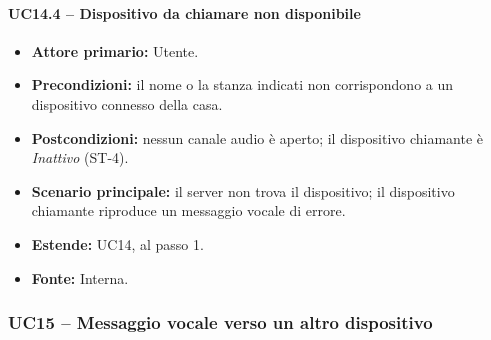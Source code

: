 \documentclass[12pt,a4paper]{article}
\newcommand{\tightlist}{\setlength{\itemsep}{1pt}\setlength{\parskip}{0pt}}
\begin{document}
\paragraph{UC14.4 -- Dispositivo da chiamare non disponibile}

\begin{itemize}

\tightlist

\item \textbf{Attore primario:} Utente.

\item \textbf{Precondizioni:} il nome o la stanza indicati non corrispondono a un dispositivo connesso della casa.

\item \textbf{Postcondizioni:} nessun canale audio è aperto; il dispositivo chiamante è \emph{Inattivo} (ST-4).

\item \textbf{Scenario principale:} il server non trova il dispositivo; il dispositivo chiamante riproduce un messaggio vocale di errore.

\item \textbf{Estende:} UC14, al passo 1.

\item \textbf{Fonte:} Interna.

\end{itemize}



\subsubsection{UC15 -- Messaggio vocale verso un altro dispositivo}
\end{document}
